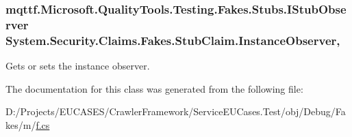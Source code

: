 \hypertarget{class_system_1_1_security_1_1_claims_1_1_fakes_1_1_stub_claim_a1599f8440ef8217aeca0bb76da9a360d}{
\subsubsection[{Instance\-Observer}]{\setlength{\rightskip}{0pt plus 5cm}mqttf.\-Microsoft.\-Quality\-Tools.\-Testing.\-Fakes.\-Stubs.\-I\-Stub\-Observer System.\-Security.\-Claims.\-Fakes.\-Stub\-Claim.\-Instance\-Observer\hspace{0.3cm}{\ttfamily [get]}, {\ttfamily [set]}}}\label{class_system_1_1_security_1_1_claims_1_1_fakes_1_1_stub_claim_a1599f8440ef8217aeca0bb76da9a360d}


Gets or sets the instance observer.



The documentation for this class was generated from the following file\-:\begin{DoxyCompactItemize}
\item 
D\-:/\-Projects/\-E\-U\-C\-A\-S\-E\-S/\-Crawler\-Framework/\-Service\-E\-U\-Cases.\-Test/obj/\-Debug/\-Fakes/m/\hyperlink{m_2f_8cs}{f.\-cs}\end{DoxyCompactItemize}
